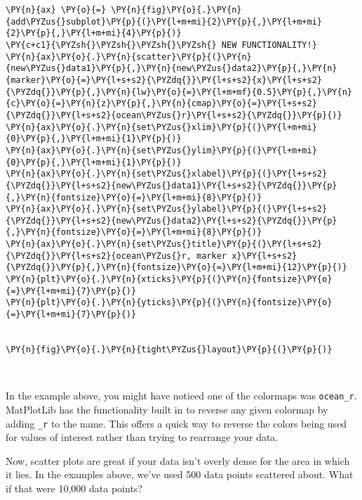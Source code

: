 \begin{tcolorbox}[breakable, size=fbox, boxrule=1pt, pad at break*=1mm,colback=cellbackground, colframe=cellborder]
\begin{Verbatim}[commandchars=\\\{\}]
\PY{n}{ax} \PY{o}{=} \PY{n}{fig}\PY{o}{.}\PY{n}{add\PYZus{}subplot}\PY{p}{(}\PY{l+m+mi}{2}\PY{p}{,}\PY{l+m+mi}{2}\PY{p}{,}\PY{l+m+mi}{4}\PY{p}{)}
\PY{c+c1}{\PYZsh{}\PYZsh{}\PYZsh{}\PYZsh{} NEW FUNCTIONALITY!}
\PY{n}{ax}\PY{o}{.}\PY{n}{scatter}\PY{p}{(}\PY{n}{new\PYZus{}data1}\PY{p}{,}\PY{n}{new\PYZus{}data2}\PY{p}{,}\PY{n}{marker}\PY{o}{=}\PY{l+s+s2}{\PYZdq{}}\PY{l+s+s2}{x}\PY{l+s+s2}{\PYZdq{}}\PY{p}{,}\PY{n}{lw}\PY{o}{=}\PY{l+m+mf}{0.5}\PY{p}{,}\PY{n}{c}\PY{o}{=}\PY{n}{z}\PY{p}{,}\PY{n}{cmap}\PY{o}{=}\PY{l+s+s2}{\PYZdq{}}\PY{l+s+s2}{ocean\PYZus{}r}\PY{l+s+s2}{\PYZdq{}}\PY{p}{)}
\PY{n}{ax}\PY{o}{.}\PY{n}{set\PYZus{}xlim}\PY{p}{(}\PY{l+m+mi}{0}\PY{p}{,}\PY{l+m+mi}{1}\PY{p}{)}
\PY{n}{ax}\PY{o}{.}\PY{n}{set\PYZus{}ylim}\PY{p}{(}\PY{l+m+mi}{0}\PY{p}{,}\PY{l+m+mi}{1}\PY{p}{)}
\PY{n}{ax}\PY{o}{.}\PY{n}{set\PYZus{}xlabel}\PY{p}{(}\PY{l+s+s2}{\PYZdq{}}\PY{l+s+s2}{new\PYZus{}data1}\PY{l+s+s2}{\PYZdq{}}\PY{p}{,}\PY{n}{fontsize}\PY{o}{=}\PY{l+m+mi}{8}\PY{p}{)}
\PY{n}{ax}\PY{o}{.}\PY{n}{set\PYZus{}ylabel}\PY{p}{(}\PY{l+s+s2}{\PYZdq{}}\PY{l+s+s2}{new\PYZus{}data2}\PY{l+s+s2}{\PYZdq{}}\PY{p}{,}\PY{n}{fontsize}\PY{o}{=}\PY{l+m+mi}{8}\PY{p}{)}
\PY{n}{ax}\PY{o}{.}\PY{n}{set\PYZus{}title}\PY{p}{(}\PY{l+s+s2}{\PYZdq{}}\PY{l+s+s2}{ocean\PYZus{}r, marker x}\PY{l+s+s2}{\PYZdq{}}\PY{p}{,}\PY{n}{fontsize}\PY{o}{=}\PY{l+m+mi}{12}\PY{p}{)}
\PY{n}{plt}\PY{o}{.}\PY{n}{xticks}\PY{p}{(}\PY{n}{fontsize}\PY{o}{=}\PY{l+m+mi}{7}\PY{p}{)}
\PY{n}{plt}\PY{o}{.}\PY{n}{yticks}\PY{p}{(}\PY{n}{fontsize}\PY{o}{=}\PY{l+m+mi}{7}\PY{p}{)}


\PY{n}{fig}\PY{o}{.}\PY{n}{tight\PYZus{}layout}\PY{p}{(}\PY{p}{)}
\end{Verbatim}
\end{tcolorbox}

    \begin{center}
    \end{center}
    { \hspace*{\fill} \\}
    
    In the example above, you might have noticed one of the colormaps was
\texttt{ocean\_r}. MatPlotLib has the functionality built in to reverse
any given colormap by adding \texttt{\_r} to the name. This offers a
quick way to reverse the colors being used for values of interest rather
than trying to rearrange your data.

Now, scatter plots are great if your data isn't overly dense for the
area in which it lies. In the examples above, we've used 500 data points
scattered about. What if that were 10,000 data points?

